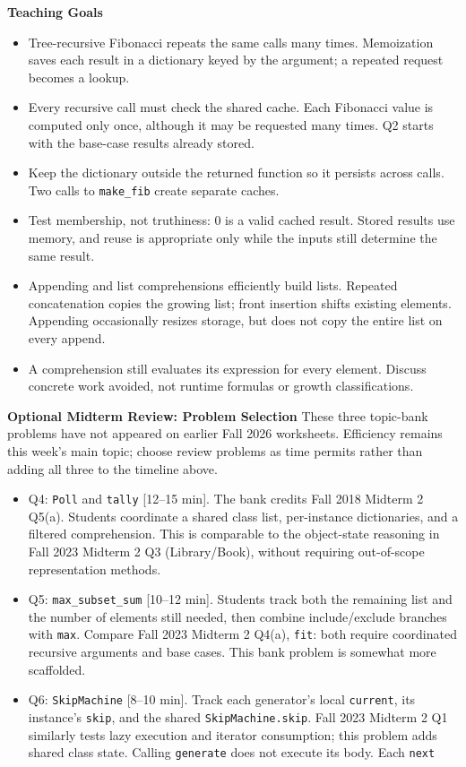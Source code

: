 \documentclass{exam}
\begin{document}
\begin{meta}
\textbf{Teaching Goals}
\begin{itemize}
    \item Tree-recursive Fibonacci repeats the same calls many times. Memoization saves each result in a dictionary keyed by the argument; a repeated request becomes a lookup.
    \item Every recursive call must check the shared cache. Each Fibonacci value is computed only once, although it may be requested many times. Q2 starts with the base-case results already stored.
    \item Keep the dictionary outside the returned function so it persists across calls. Two calls to \lstinline{make_fib} create separate caches.
    \item Test membership, not truthiness: 0 is a valid cached result. Stored results use memory, and reuse is appropriate only while the inputs still determine the same result.
    \item Appending and list comprehensions efficiently build lists. Repeated concatenation copies the growing list; front insertion shifts existing elements. Appending occasionally resizes storage, but does not copy the entire list on every append.
    \item A comprehension still evaluates its expression for every element. Discuss concrete work avoided, not runtime formulas or growth classifications.
\end{itemize}
\textbf{Optional Midterm Review: Problem Selection}
These three topic-bank problems have not appeared on earlier Fall 2026 worksheets. Efficiency remains this week's main topic; choose review problems as time permits rather than adding all three to the timeline above.
\begin{itemize}
    \item Q4: \lstinline{Poll} and \lstinline{tally} [12--15 min]. The bank credits Fall 2018 Midterm 2 Q5(a). Students coordinate a shared class list, per-instance dictionaries, and a filtered comprehension. This is comparable to the object-state reasoning in Fall 2023 Midterm 2 Q3 (Library/Book), without requiring out-of-scope representation methods.
    \item Q5: \lstinline{max_subset_sum} [10--12 min]. Students track both the remaining list and the number of elements still needed, then combine include/exclude branches with \lstinline{max}. Compare Fall 2023 Midterm 2 Q4(a), \lstinline{fit}: both require coordinated recursive arguments and base cases. This bank problem is somewhat more scaffolded.
    \item Q6: \lstinline{SkipMachine} [8--10 min]. Track each generator's local \lstinline{current}, its instance's \lstinline{skip}, and the shared \lstinline{SkipMachine.skip}. Fall 2023 Midterm 2 Q1 similarly tests lazy execution and iterator consumption; this problem adds shared class state. Calling \lstinline{generate} does not execute its body. Each \lstinline{next}

\end{itemize}
\end{meta}
\end{document}
